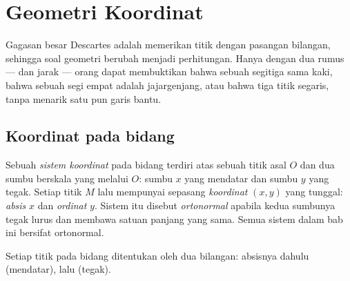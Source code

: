 \chapter{Geometri Koordinat}\label{ch:g10:coordgeom}

Gagasan besar Descartes adalah memerikan titik dengan pasangan bilangan,
sehingga soal geometri berubah menjadi perhitungan. Hanya dengan dua rumus
---  dan jarak --- orang dapat membuktikan bahwa sebuah segitiga
sama kaki, bahwa sebuah segi empat adalah jajargenjang, atau bahwa tiga titik
segaris, tanpa menarik satu pun garis bantu.

\section{Koordinat pada bidang}

\begin{definition}\label{def:g10:coordgeom:system}
Sebuah \emph{sistem koordinat} pada bidang terdiri
atas sebuah titik asal $O$ dan dua sumbu berskala yang melalui $O$: sumbu
$x$ yang mendatar dan sumbu $y$ yang tegak. Setiap titik $M$ lalu mempunyai
sepasang \emph{koordinat} $(x, y)$ yang tunggal:
\emph{absis} $x$ dan \emph{ordinat} $y$. Sistem
itu disebut \emph{ortonormal} apabila kedua sumbunya
tegak lurus dan membawa satuan panjang yang sama. Semua sistem dalam bab
ini bersifat ortonormal.
\end{definition}

\begin{omfigure}

{\small Setiap titik pada bidang ditentukan oleh dua bilangan: absisnya
dahulu (mendatar), lalu  (tegak).}
\end{omfigure}

